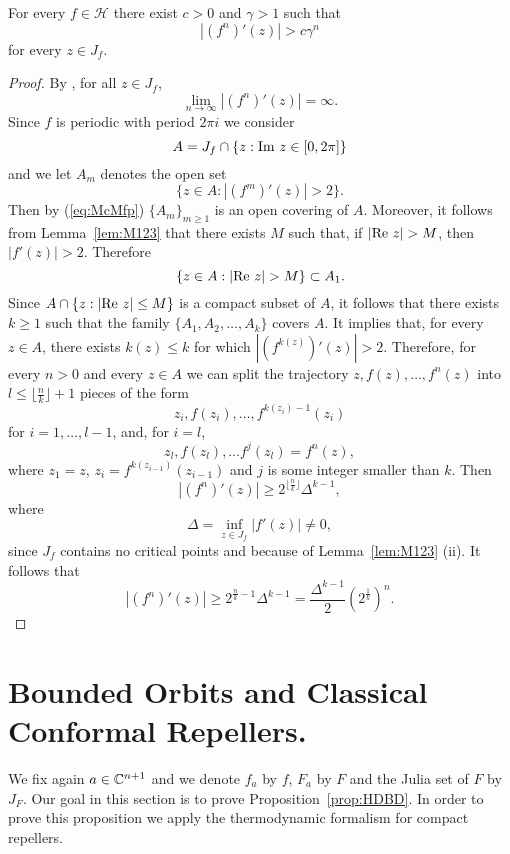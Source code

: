 \begin{proposition}\label{prop:fisexpand}
  For every $f \in \mathcal{H}$ there exist $c>0$ and $\gamma >1$ such that
  \[
  |(f^n)'(z)|>c\gamma^n 
  \]
  for every $z\in J_{f}.$
\end{proposition}

\begin{proof}
  By \cite[Proposition 6.1]{mcmullen:area}, for all $z\in J_f$,
  \begin{equation}
    \label{eq:McMfp}
   \lim_{n\to \infty} |(f^n)'(z)|=\infty.
  \end{equation}
  Since $f$ is periodic with period $2\pi i$ we consider
  \[
  A=J_f\cap \{z:\textrm{Im } z\in [0,2\pi]\}
  \]
  and we let $A_m$ denotes the open set
  \[
  \{z\in A:|(f^m)'(z)|>2\}.
  \]
  Then by (\ref{eq:McMfp}) $\{A_m\}_{m\geq 1}$ is an open covering of
  $A$. Moreover, it follows from Lemma~\ref{lem:M123} that there exists $M$
  such that, if $|\re z|>M$, then $|f'(z)|>2$. Therefore
  \[
  \{z\in A:|\re z|>M\}\subset A_1.
  \]
  Since $A\cap \{z:|\textrm{Re } z|\leq M\}$ is a compact subset of $A$, it follows
  that there exists $k\geq 1$ such that the family $\{A_1, A_2, \ldots,
  A_k\}$ covers $A$. It implies that, for every $z\in A$, there exists
  $k(z)\leq k$ for which $|(f^{k(z)})'(z)|>2$. Therefore, for every $n>0$
  and every $z\in A$ we can split the trajectory $z, f(z), \ldots, f^n(z)$
  into $l\leq\lfloor\frac{n}{k}\rfloor+1$ pieces of the form
  \[
  z_i, f(z_i),\ldots, f^{k(z_i)-1}(z_i)
  \]
  for $i=1,\ldots, l-1$, and, for $i=l$,
  \[
  z_l, f(z_l),\ldots f^j(z_l)=f^n(z),
  \]
  where $z_1=z$, $z_i=f^{k(z_{i-1})}(z_{i-1})$ and $j$ is some integer
  smaller than $k$.  Then
  \[
  |(f^n)'(z)|\geq 2^{\lfloor\frac{n}{k}\rfloor}\Delta^{k-1},
  \]
  where
  \[
  \Delta=\inf_{z\in J_f}|f'(z)|\neq 0,
  \]
  since $J_f$ contains no critical points and because of
  Lemma~\ref{lem:M123} (ii).  It follows that
  \[
  |(f^n)'(z)|\geq 2^{\frac{n}{k}-1}\Delta^{k-1}= \frac{
    \Delta^{k-1}}{2} (2^{\frac{1}{k}})^n.
  \]
\end{proof}

\section{Bounded Orbits and Classical Conformal Repellers.}

We fix again $a\in{\mathbb C}^{n+1}$ and we denote $f_a$ by $f$, $F_a$ by $F$ and
the Julia set of $F$ by $J_F. $ Our goal in this section is to prove
Proposition~\ref{prop:HDBD}. In order to prove this proposition we apply the
thermodynamic formalism for compact repellers.

